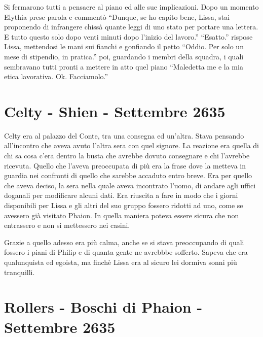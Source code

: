     Si fermarono tutti a pensaere al piano ed alle sue implicazioni. Dopo
    un momento Elythia prese parola e commentò ``Dunque, se ho capito bene,
    Lissa, stai proponendo di infrangere chissà quante leggi di uno stato
    per portare una lettera. E tutto questo solo dopo venti minuti dopo
    l'inizio del lavoro.'' ``Esatto.'' rispose Lissa, mettendosi le
    mani sui fianchi e gonfiando il petto ``Oddio. Per solo un mese di
    stipendio, in pratica.'' poi, guardando i membri della squadra, i quali
    sembravano tutti pronti a mettere in atto quel piano ``Maledetta me e
    la mia etica lavorativa. Ok. Facciamolo.''

  \section{Celty - Shien - Settembre 2635}

    Celty era al palazzo del Conte, tra una consegna ed un'altra. Stava
    pensando all'incontro che aveva avuto l'altra sera con quel signore. La
    reazione era quella di chi sa cosa c'era dentro la busta che avrebbe
    dovuto consegnare e chi l'avrebbe ricevuta. Quello che l'aveva
    preoccupata di più era la frase dove la metteva in guardia nei
    confronti di quello che sarebbe accaduto entro breve. Era per quello
    che aveva deciso, la sera nella quale aveva incontrato l'uomo, di
    andare agli uffici doganali per modificare alcuni dati. Era riuscita a
    fare in modo che i giorni disponibili per Lissa e gli altri del suo
    gruppo fossero ridotti ad uno, come se avessero già visitato Phaion. In
    quella maniera poteva essere sicura che non entrassero e non si
    mettessero nei casini.

    Grazie a quello adesso era più calma, anche se si stava preoccupando di
    quali fossero i piani di Philip e di quanta gente ne avrebbbe sofferto.
    Sapeva che era qualunquista ed egoista, ma finchè Lissa era al sicuro
    lei dormiva sonni più tranquilli.

  \section{Rollers - Boschi di Phaion - Settembre 2635}

